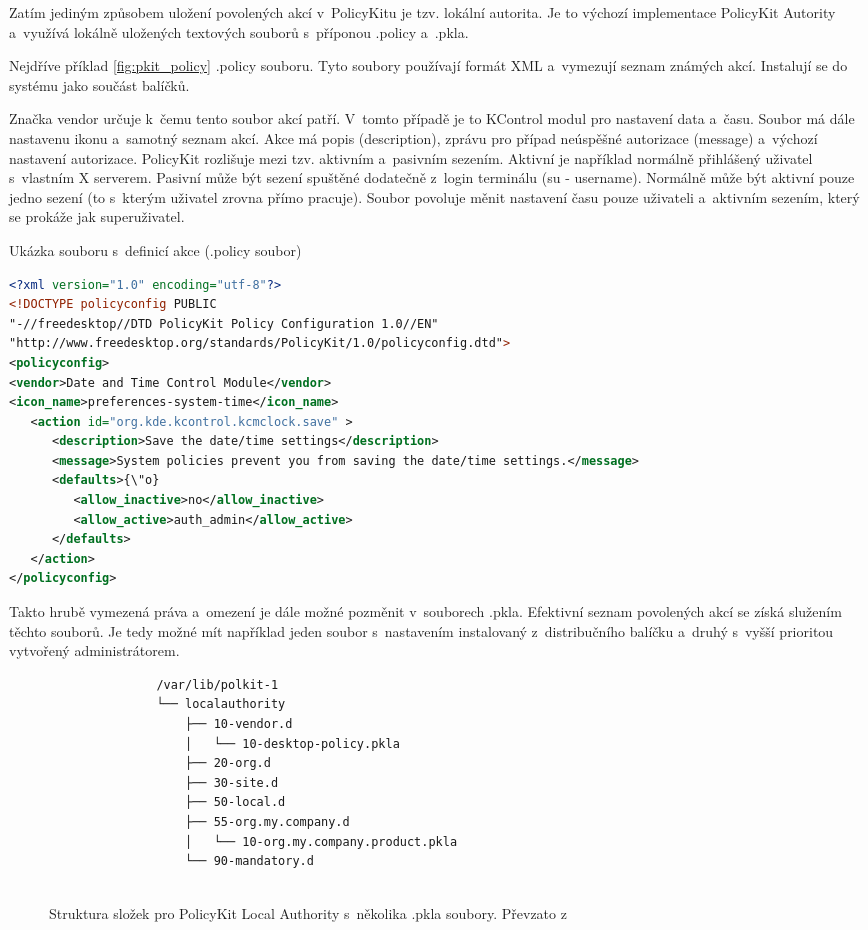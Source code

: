 {Zatím jediným způsobem uložení povolených akcí v~PolicyKitu je tzv. lokální autorita. Je to výchozí implementace PolicyKit Autority a~využívá lokálně uložených textových souborů s~příponou .policy a~.pkla.

Nejdříve příklad \ref{fig:pkit_policy} .policy souboru. Tyto soubory používají formát XML a~vymezují seznam známých akcí. Instalují se do systému jako součást balíčků.

Značka vendor určuje k~čemu tento soubor akcí patří. V~tomto případě je to KControl modul pro nastavení data a~času. Soubor má dále nastavenu ikonu a~samotný seznam akcí. Akce má popis (description), zprávu pro případ neúspěšné autorizace (message) a~výchozí nastavení autorizace. PolicyKit rozlišuje mezi tzv. aktivním a~pasivním sezením. Aktivní je například normálně přihlášený uživatel s~vlastním X serverem. Pasivní může být sezení spuštěné dodatečně z~login terminálu (su - username). Normálně může být aktivní pouze jedno sezení (to s~kterým uživatel zrovna přímo pracuje). Soubor povoluje měnit nastavení času pouze uživateli a~aktivním sezením, který se prokáže jak superuživatel.

\begin{mylisting}
\caption{Ukázka souboru s~definicí akce (.policy soubor)}
\label{fig:pkit_policy}
\begin{lstlisting}[language=XML]
<?xml version="1.0" encoding="utf-8"?>
<!DOCTYPE policyconfig PUBLIC
"-//freedesktop//DTD PolicyKit Policy Configuration 1.0//EN"
"http://www.freedesktop.org/standards/PolicyKit/1.0/policyconfig.dtd">
<policyconfig>
<vendor>Date and Time Control Module</vendor>
<icon_name>preferences-system-time</icon_name>
   <action id="org.kde.kcontrol.kcmclock.save" >
      <description>Save the date/time settings</description>
      <message>System policies prevent you from saving the date/time settings.</message>
      <defaults>{\"o}
         <allow_inactive>no</allow_inactive>
         <allow_active>auth_admin</allow_active>
      </defaults>
   </action>
</policyconfig>
\end{lstlisting}
\end{mylisting}

Takto hrubě vymezená práva a~omezení je dále možné pozměnit v~souborech .pkla. Efektivní seznam povolených akcí se získá služením těchto souborů. Je tedy možné mít například jeden soubor s~nastavením instalovaný z~distribučního balíčku a~druhý s~vyšší prioritou vytvořený administrátorem.

\begin{figure}[h]
    \centering
    \label{fig:pkit_la}
    \caption{Struktura složek pro PolicyKit Local Authority s~několika .pkla soubory. Převzato z \cite{pkit_pkla}}
    \begin{verbatim}
               /var/lib/polkit-1
               └── localauthority
                   ├── 10-vendor.d
                   │   └── 10-desktop-policy.pkla
                   ├── 20-org.d
                   ├── 30-site.d
                   ├── 50-local.d
                   ├── 55-org.my.company.d
                   │   └── 10-org.my.company.product.pkla
                   └── 90-mandatory.d


\end{verbatim}
\end{figure}}
